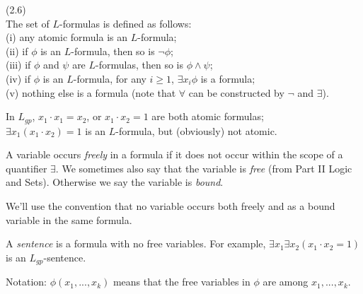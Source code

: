 \documentclass[a4paper]{article}
\begin{document}
\begin{defi} (2.6)\\
    The set of $L$-formulas is defined as follows:\\
    (i) any atomic formula is an $L$-formula;\\
    (ii) if $\phi$ is an $L$-formula, then so is $\neg \phi$;\\
    (iii) if $\phi$ and $\psi$ are $L$-formulas, then so is $\phi \wedge \psi$;\\
    (iv) if $\phi$ is an $L$-formula, for any $i \geq 1$, $\exists x_i \phi$ is a formula;\\
    (v) nothing else is a formula (note that $\forall$ can be constructed by $\neg$ and $\exists$).
\end{defi}

\begin{eg}
    In $L_{gp}$, $x_1\cdot x_1 = x_2$, or $x_1\cdot x_2=1$ are both atomic formulas;\\
    $\exists x_1(x_1 \cdot x_2) = 1$ is an $L$-formula, but (obviously) not atomic.
\end{eg}

A variable occurs \emph{freely} in a formula if it does not occur within the scope of a quantifier $\exists$. We sometimes also say that the variable is \emph{free} (from Part II Logic and Sets). Otherwise we say the variable is \emph{bound}.

We'll use the convention that no variable occurs both freely and as a bound variable in the same formula.

A \emph{sentence} is a formula with no free variables. For example, $\exists x_1\exists x_2 (x_1\cdot x_2=1)$ is an $L_{gp}$-sentence.

Notation: $\phi(x_1,...,x_k)$ means that the free variables in $\phi$ are among $x_1,...,x_k$.
\end{document}
